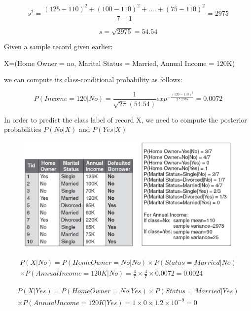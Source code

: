 				\begin{equation}
					s^{2} = \frac{(125-110)^{2} + (100-110)^{2} + .... + (75-110)^{2}}{7-1} = 2975
				\end{equation}

				\begin{equation}
					s = \sqrt{2975} = 54.54
				\end{equation}

				Given a sample record given earlier:

				X=(Home Owner = no, Marital Status = Married, Annual Income = 120K)

				we can compute its class-conditional probability as follows:

				\begin{equation}
					P(Income = 120|No) = \frac{1}{\sqrt{2\pi}(54.54)}
					exp^{-\frac{(120-110)^{2}}{2*2975}} = 0.0072
				\end{equation}

				In order to predict the class label of record X, we need to compute the 
				posterior probabilities $P(No|X)$ and $P(Yes|X)$

				\begin{figure}[H]
					\includegraphics[width=\textwidth]{pics/example.png}
				\end{figure}

				\begin{equation}
				\begin{split}
					P(X|No) = P(Home Owner = No|No) \times P(Status = Married|No) \\
					\times P(Annual Income = 120K|No)
					= \frac{4}{7} \times \frac{4}{7} \times 0.0072 = 0.0024
				\end{split}
				\end{equation}

				\begin{equation}
				\begin{split}
					P(X|Yes) = P(Home Owner = No|Yes) \times P(Status = Married|Yes) \\
					\times P(Annual Income = 120K|Yes)
					= 1 \times 0 \times 1.2 \times 10^{-9} = 0
				\end{split}
				\end{equation}

